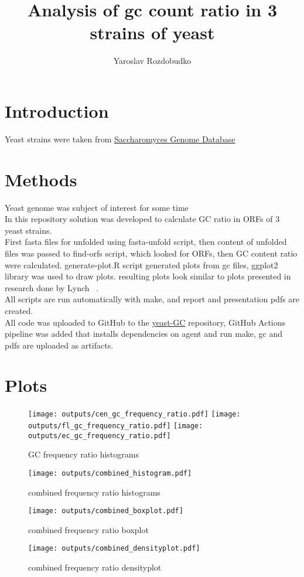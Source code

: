 \documentclass{article}
\title{Analysis of gc count ratio in 3 strains of yeast}
\author{Yaroslav Rozdobudko}
\begin{document}
\maketitle

\section{Introduction}


Yeast strains were taken from \href{http://sgd-archive.yeastgenome.org/}{Saccharomyces Genome Database} ~\cite{Engel2013} 

\section{Methods}
Yeast genome was subject of interest for some time ~\cite{DUJON1996263} ~\cite{Dujon2004} ~\cite{Dujon2017} \\
In this repository solution was developed to calculate GC ratio in ORFs of 3 yeast strains. \\
First fasta files for unfolded using fasta-unfold script, then content of unfolded files was passed to find-orfs script,
which looked for ORFs, then GC content ratio were calculated.
generate-plot.R script generated plots from gc files, ggplot2 library was used to draw plots.
resulting plots look similar to plots presented in research done by Lynch ~\cite{Lynch2010}. \\
All scripts are run automatically with make, and report and presentation pdfs are created. \\
All code was uploaded to GitHub to the \href{https://github.com/jarekrzdbk/yeast-GC}{yeast-GC} repository, 
GitHub Actions pipeline was added that installs dependencies on agent and run  make, gc and pdfs are uploaded as artifacts.


\section{Plots}

\begin{figure}
    \texttt{[image: outputs/cen\_gc\_frequency\_ratio.pdf]}
    \texttt{[image: outputs/fl\_gc\_frequency\_ratio.pdf]}
    \texttt{[image: outputs/ec\_gc\_frequency\_ratio.pdf]}
    \caption{GC frequency ratio histograms}
\end{figure}

\begin{figure}
    \texttt{[image: outputs/combined\_histogram.pdf]}
    \caption{combined frequency ratio histograms}
\end{figure}

\begin{figure}
    \texttt{[image: outputs/combined\_boxplot.pdf]}
    \caption{combined frequency ratio boxplot}
\end{figure}

\begin{figure}
    \texttt{[image: outputs/combined\_densityplot.pdf]}
    \caption{combined frequency ratio densityplot}
\end{figure}

\clearpage


\end{document}
